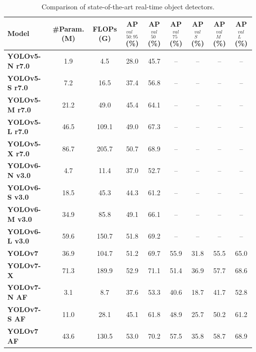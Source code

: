 \documentclass[10pt,twocolumn,letterpaper]{article}
\begin{document}
	\begin{table}[t]
		\centering
		\begin{threeparttable}[t]
			\footnotesize
			\caption{Comparison of state-of-the-art real-time object detectors.}
			\label{table:sota}
			\setlength\tabcolsep{4.0pt}
			\begin{tabular}{lcccccccc}
				\toprule
				\textbf{Model} & \textbf{\#Param. (M)} & \textbf{FLOPs (G)} & \textbf{AP$^{val}_{50:95}$ (\%)} & \textbf{AP$^{val}_{50}$ (\%)} & \textbf{AP$^{val}_{75}$ (\%)} & \textbf{AP$^{val}_{S}$ (\%)} & \textbf{AP$^{val}_{M}$ (\%)} & \textbf{AP$^{val}_{L}$ (\%)} \\
				\midrule
				\textbf{YOLOv5-N r7.0~\cite{glenn2022yolov5}} & 1.9 & 4.5 & 28.0 & 45.7 & -- & -- & -- & -- \\
				\textbf{YOLOv5-S r7.0~\cite{glenn2022yolov5}} & 7.2 & 16.5 & 37.4 & 56.8 & -- & -- & -- & -- \\
				\textbf{YOLOv5-M r7.0~\cite{glenn2022yolov5}} & 21.2 & 49.0 & 45.4 & 64.1 & -- & -- & -- & -- \\
				\textbf{YOLOv5-L r7.0~\cite{glenn2022yolov5}} & 46.5 & 109.1 & 49.0 & 67.3 & -- & -- & -- & -- \\
				\textbf{YOLOv5-X r7.0~\cite{glenn2022yolov5}} & 86.7 & 205.7 & 50.7 & 68.9 & -- & -- & -- & -- \\
				\midrule
				\textbf{YOLOv6-N v3.0~\cite{li2023yolov6}} & 4.7 & 11.4 & 37.0 & 52.7 & -- & -- & -- & -- \\
				\textbf{YOLOv6-S v3.0~\cite{li2023yolov6}} & 18.5 & 45.3 & 44.3 & 61.2 & -- & -- & -- & -- \\
				\textbf{YOLOv6-M v3.0~\cite{li2023yolov6}} & 34.9 & 85.8 & 49.1 & 66.1 & -- & -- & -- & -- \\
				\textbf{YOLOv6-L v3.0~\cite{li2023yolov6}} & 59.6 & 150.7 & 51.8 & 69.2 & -- & -- & -- & -- \\
				\midrule
				\textbf{YOLOv7~\cite{wang2023yolov7}} & 36.9 & 104.7 & 51.2 & 69.7 & 55.9 & 31.8 & 55.5 & 65.0 \\
				\textbf{YOLOv7-X~\cite{wang2023yolov7}} & 71.3 & 189.9 & 52.9 & 71.1 & 51.4 & 36.9 & 57.7 & 68.6 \\
				\midrule
				\textbf{YOLOv7-N AF~\cite{wang2023yolov7}} & 3.1 & 8.7 & 37.6 & 53.3 & 40.6 & 18.7 & 41.7 & 52.8 \\
				\textbf{YOLOv7-S AF~\cite{wang2023yolov7}} & 11.0 & 28.1 & 45.1 & 61.8 & 48.9 & 25.7 & 50.2 & 61.2 \\
				\textbf{YOLOv7 AF~\cite{wang2023yolov7}} & 43.6 & 130.5 & 53.0 & 70.2 & 57.5 & 35.8 & 58.7 & 68.9 \\

\end{tabular}
\end{threeparttable}
\end{table}
\end{document}
